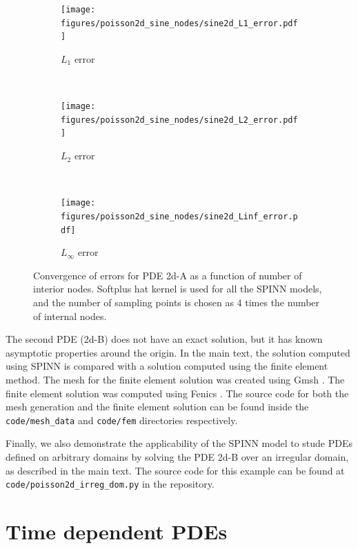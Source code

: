 \documentclass[12pt]{article}
\newcommand{\code}[1]{\lstinline{#1}}
\begin{document}
\begin{figure}
\begin{subfigure}{0.32\textwidth}
\centering
\texttt{[image: figures/poisson2d\_sine\_nodes/sine2d\_L1\_error.pdf]}
\caption{$L_1$ error}
\label{fig:2d_A_L1}
\end{subfigure}
~
\begin{subfigure}{0.32\textwidth}
\centering
\texttt{[image: figures/poisson2d\_sine\_nodes/sine2d\_L2\_error.pdf]}
\caption{$L_2$ error}
\label{fig:2d_A_L2}    
\end{subfigure}
~
\begin{subfigure}{0.32\textwidth}
\centering
\texttt{[image: figures/poisson2d\_sine\_nodes/sine2d\_Linf\_error.pdf]}
\caption{$L_{\infty}$ error}
\label{fig:2d_A_Linf_a}    
\end{subfigure}
\caption{Convergence of errors for PDE 2d-A as a function of number of interior nodes. Softplus hat kernel is used for all the SPINN models, and the number of sampling points is chosen as 4 times the number of internal nodes.}
\label{fig:sine2d_errors}
\end{figure} 

The second PDE (2d-B) does not have an exact solution, but it has known asymptotic properties around the origin. In the main text, the solution computed using SPINN is compared with a solution computed using the finite element method. The mesh for the finite element solution was created using Gmsh \cite{gmsh}. The finite element solution was computed using Fenics \cite{AlnaesBlechta2015a, LoggMardalEtAl2012a}. The source code for both the mesh generation and the finite element solution can be found inside the \code{code/mesh_data} and \code{code/fem} directories respectively.

Finally, we also demonstrate the applicability of the SPINN model to stude PDEs defined on arbitrary domains by solving the PDE 2d-B over an irregular domain, as described in the main text. The source code for this example can be found at  \code{code/poisson2d_irreg_dom.py} in the repository.

\section{Time dependent PDEs}
\end{document}
